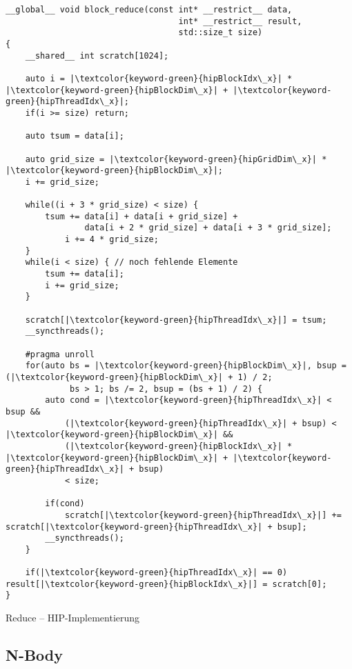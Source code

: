 \begin{code}
    \begin{verbatim}
__global__ void block_reduce(const int* __restrict__ data,
                                   int* __restrict__ result,
                                   std::size_t size)
{
    __shared__ int scratch[1024]; 

    auto i = |\textcolor{keyword-green}{hipBlockIdx\_x}| * |\textcolor{keyword-green}{hipBlockDim\_x}| + |\textcolor{keyword-green}{hipThreadIdx\_x}|;
    if(i >= size) return;

    auto tsum = data[i];

    auto grid_size = |\textcolor{keyword-green}{hipGridDim\_x}| * |\textcolor{keyword-green}{hipBlockDim\_x}|;
    i += grid_size;

    while((i + 3 * grid_size) < size) {
        tsum += data[i] + data[i + grid_size] +
                data[i + 2 * grid_size] + data[i + 3 * grid_size];
            i += 4 * grid_size;
    }
    while(i < size) { // noch fehlende Elemente
        tsum += data[i];
        i += grid_size;
    }

    scratch[|\textcolor{keyword-green}{hipThreadIdx\_x}|] = tsum;
    __syncthreads();

    #pragma unroll
    for(auto bs = |\textcolor{keyword-green}{hipBlockDim\_x}|, bsup = (|\textcolor{keyword-green}{hipBlockDim\_x}| + 1) / 2;
             bs > 1; bs /= 2, bsup = (bs + 1) / 2) {
        auto cond = |\textcolor{keyword-green}{hipThreadIdx\_x}| < bsup &&
            (|\textcolor{keyword-green}{hipThreadIdx\_x}| + bsup) < |\textcolor{keyword-green}{hipBlockDim\_x}| &&
            (|\textcolor{keyword-green}{hipBlockIdx\_x}| * |\textcolor{keyword-green}{hipBlockDim\_x}| + |\textcolor{keyword-green}{hipThreadIdx\_x}| + bsup)
            < size;

        if(cond)
            scratch[|\textcolor{keyword-green}{hipThreadIdx\_x}|] += scratch[|\textcolor{keyword-green}{hipThreadIdx\_x}| + bsup];
        __syncthreads();
    }

    if(|\textcolor{keyword-green}{hipThreadIdx\_x}| == 0) result[|\textcolor{keyword-green}{hipBlockIdx\_x}|] = scratch[0];
}
    \end{verbatim}
    \caption{Reduce -- HIP-Implementierung}
    \label{anhang:hip:reduction}
\end{code}

\subsection{N-Body}

